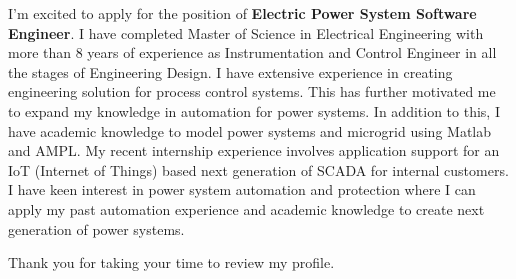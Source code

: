 \documentclass[11pt, a4paper]{ishan-cl} %
\newcommand{\positionname}{\textbf{Electric Power System Software Engineer}}%
\begin{document}
\makecvheader %
\makelettertitle %


\begin{cvletter}

I’m excited to apply for the position of \textbf{\positionname}. %
I have completed Master of Science in Electrical Engineering with more than 8 years of experience as Instrumentation and Control Engineer in all the stages of Engineering Design. I have extensive experience in creating engineering solution for process control systems. This has further motivated me to expand my knowledge in automation for power systems. In addition to this, I have academic knowledge to model power systems and microgrid using Matlab and AMPL. My recent internship experience involves application support for an IoT (Internet of Things) based next generation of SCADA for internal customers. I have keen interest in power system automation and protection where I can apply my past automation experience and academic knowledge to create next generation of power systems.

		Thank you for taking your time to review my profile.

\end{cvletter}

\makeletterclosing %
\end{document}
